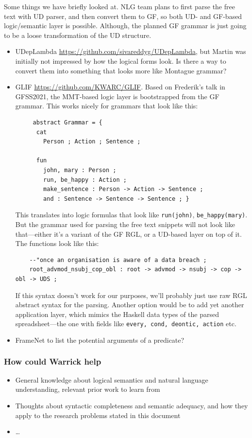 \documentclass[runningheads]{llncs}
\begin{document}
Some things we have briefly looked at. NLG team plans to first parse the free text with UD parser, and then convert them to GF, so both UD- and GF-based logic/semantic layer is possible. Although, the planned GF grammar is just going to be a loose transformation of the UD structure.

\begin{itemize}
    \item UDepLambda \url{https://github.com/sivareddyg/UDepLambda}, but Martin was initially not impressed by how the logical forms look. Is there a way to convert them into something that looks more like Montague grammar?
    \item GLIF \url{https://github.com/KWARC/GLIF}. Based on Frederik's talk in GFSS2021, the MMT-based logic layer is bootstrapped from the GF grammar. This works nicely for grammars that look like this:
    
    \begin{verbatim}
     abstract Grammar = {
      cat
        Person ; Action ; Sentence ;

      fun
        john, mary : Person ;
        run, be_happy : Action ;
        make_sentence : Person -> Action -> Sentence ;
        and : Sentence -> Sentence -> Sentence ; }
    \end{verbatim}
    
    This translates into logic formulas that look like \texttt{run(john)}, \texttt{be\_happy(mary)}. But the grammar used for parsing the free text snippets will not look like that---either it's a variant of the GF RGL, or a UD-based layer on top of it. The functions look like this:
    
    \begin{verbatim}
    --"once an organisation is aware of a data breach ;
    root_advmod_nsubj_cop_obl : root -> advmod -> nsubj -> cop -> obl -> UDS ;
    \end{verbatim}
    
    If this syntax doesn't work for our purposes, we'll probably just use raw RGL abstract syntax for the parsing. Another option would be to add yet another application layer, which mimics the Haskell data types of the parsed spreadsheet---the one with fields like \texttt{every, cond, deontic, action} etc.
    
    \item FrameNet to list the potential arguments of a predicate?
\end{itemize}

\subsubsection{How could Warrick help}

\begin{itemize}
    \item General knowledge about logical semantics and natural language understanding, relevant prior work to learn from
    \item Thoughts about syntactic completeness and semantic adequacy, and how they apply to the research problems stated in this document
    \item \dots
\end{itemize}
\end{document}
